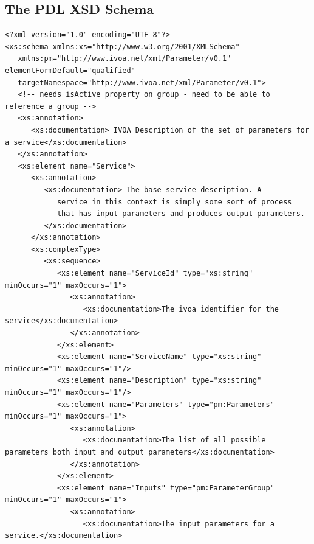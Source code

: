 \documentclass[a4paper,11pt] {ivoa}
\begin{document}
\subsection{The PDL XSD Schema}\label{pdlSchema}

\begin{lstlisting}[style=listXML]
<?xml version="1.0" encoding="UTF-8"?>
<xs:schema xmlns:xs="http://www.w3.org/2001/XMLSchema"
   xmlns:pm="http://www.ivoa.net/xml/Parameter/v0.1" elementFormDefault="qualified"
   targetNamespace="http://www.ivoa.net/xml/Parameter/v0.1">
   <!-- needs isActive property on group - need to be able to reference a group -->
   <xs:annotation>
      <xs:documentation> IVOA Description of the set of parameters for a service</xs:documentation>
   </xs:annotation>
   <xs:element name="Service">
      <xs:annotation>
         <xs:documentation> The base service description. A
            service in this context is simply some sort of process
            that has input parameters and produces output parameters.
         </xs:documentation>
      </xs:annotation>
      <xs:complexType>
         <xs:sequence>
            <xs:element name="ServiceId" type="xs:string" minOccurs="1" maxOccurs="1">
               <xs:annotation>
                  <xs:documentation>The ivoa identifier for the service</xs:documentation>
               </xs:annotation>
            </xs:element>
            <xs:element name="ServiceName" type="xs:string" minOccurs="1" maxOccurs="1"/>
            <xs:element name="Description" type="xs:string" minOccurs="1" maxOccurs="1"/>
            <xs:element name="Parameters" type="pm:Parameters" minOccurs="1" maxOccurs="1">
               <xs:annotation>
                  <xs:documentation>The list of all possible parameters both input and output parameters</xs:documentation>
               </xs:annotation>
            </xs:element>
            <xs:element name="Inputs" type="pm:ParameterGroup" minOccurs="1" maxOccurs="1">
               <xs:annotation>
                  <xs:documentation>The input parameters for a service.</xs:documentation>

\end{lstlisting}
\end{document}
